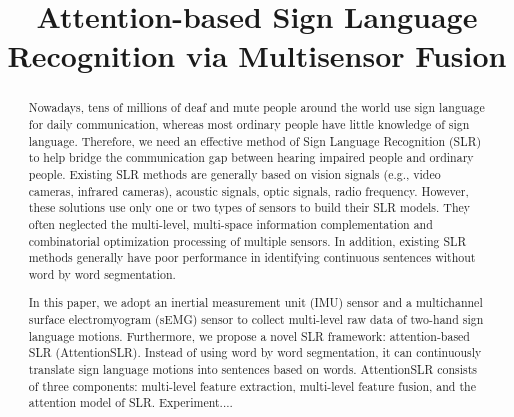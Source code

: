 \documentclass[10pt, conference, letterpaper]{IEEEtran}
\begin{document}
\title{Attention-based Sign Language Recognition via Multisensor Fusion}


\maketitle


\begin{abstract}
Nowadays, tens of millions of deaf and mute people around the world use sign language for daily communication, whereas most ordinary people have little knowledge of sign language. Therefore, we need an effective method of Sign Language Recognition (SLR) to help bridge the communication gap between hearing impaired people and ordinary people. Existing SLR methods are generally based on vision signals (e.g., video cameras, infrared cameras), acoustic signals, optic signals, radio frequency. However, these solutions use only one or two types of sensors to build their SLR models. They often neglected the multi-level, multi-space information complementation and combinatorial optimization processing of multiple sensors. In addition, existing SLR methods generally have poor performance in identifying continuous sentences without word by word segmentation. 

In this paper, we adopt an inertial measurement unit (IMU) sensor and a multichannel surface electromyogram (sEMG) sensor to collect multi-level raw data of two-hand sign language motions. Furthermore, we propose a novel SLR framework: attention-based SLR (AttentionSLR). Instead of using word by word segmentation, it can continuously translate sign language motions into sentences based on words. AttentionSLR consists of three components: multi-level feature extraction, multi-level feature fusion, and the attention model of SLR. Experiment....

\end{abstract}
\end{document}
